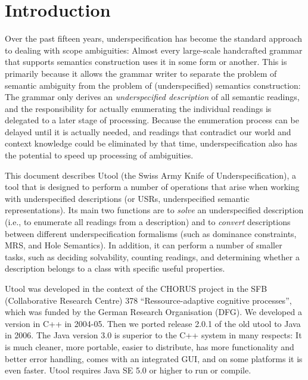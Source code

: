 
\section{Introduction}  \label{sec:introduction}

Over the past fifteen years, underspecification has become the
standard approach to dealing with scope ambiguities: Almost every
large-scale handcrafted grammar that supports semantics construction
uses it in some form or another. This is primarily because it allows
the grammar writer to separate the problem of semantic ambiguity from
the problem of (underspecified) semantics construction: The grammar
only derives an \emph{underspecified description} of all semantic
readings, and the responsibility for actually enumerating the
individual readings is delegated to a later stage of
processing. Because the enumeration process can be delayed until it is
actually needed, and readings that contradict our world and context
knowledge could be eliminated by that time, underspecification also
has the potential to speed up processing of ambiguities.

This document describes Utool (the Swiss Army Knife of
Underspecification), a tool that is designed to perform a number of
operations that arise when working with underspecified descriptions
(or USRs, underspecified semantic representations). Its main two
functions are to \emph{solve} an underspecified description (i.e., to
enumerate all readings from a description) and to \emph{convert}
descriptions between different underspecification formalisms (such as
dominance constraints, MRS, and Hole Semantics). In addition, it can
perform a number of smaller tasks, such as deciding solvability,
counting readings, and determining whether a description belongs to a
class with specific useful properties.

Utool was developed in the context of the CHORUS project in the SFB
(Collaborative Research Centre) 378 ``Ressource-adaptive cognitive
processes'', which was funded by the German Research Organisation
(DFG). We developed a version in C++ in 2004-05. Then we ported
release 2.0.1 of the old utool to Java in 2006. The Java version 3.0
is superior to the C++ system in many respects: It is much cleaner,
more portable, easier to distribute, has more functionality and better
error handling, comes with an integrated GUI, and on some platforms it
is even faster. Utool requires Java SE 5.0 or higher to run or
compile.

